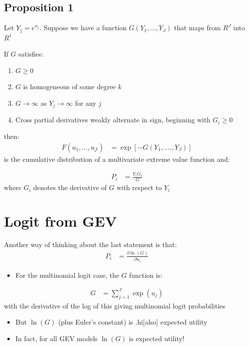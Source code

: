 \documentclass[11pt]{article}
\begin{document}
\subsection{Proposition 1 \cite{mcfadden1978}}
\label{sec:org4183645}
Let \(Y_{j}=e^{u_{j}}\). Suppose we have a function \(G(Y_{1},...,Y_{{J}})\) that maps from \(R^{{J}}\) into \(R^1\)

If \(G\) satisfies:
\begin{enumerate}
\item \(G\geq 0\)
\item \(G\) is homogeneous of some degree \(k\)
\item \(G\rightarrow \infty\) as \(Y_{j}\rightarrow \infty\) for any \(j\)
\item Cross partial derivatives weakly alternate in sign, beginning with \(G_{i}\geq 0\)
\end{enumerate}


then:
\begin{align*}
F(u_1,...,u_\mathcal{J})&=\exp\left[-G(Y_1,....,Y_{J})\right]
\end{align*}
is the cumulative distribution of a multivariate extreme value function and:

\begin{align*}
P_{i}&=\frac{Y_{i}G_{i}}{G}
\end{align*}
where \(G_i\) denotes the derivative of \(G\) with respect to \(Y_i\)

\section{Logit from GEV}
\label{sec:org33f13e0}

Another way of thinking about the last statement is that:
\begin{align*}
P_i&=\frac{\partial \ln(G)}{\partial u_i}
\end{align*}

\begin{itemize}
\item For the multinomial logit case, the \(G\) function is:
\end{itemize}
\begin{align*}
G&=\sum_{j=1}^{{J}}\exp(u_j)
\end{align*}
with the derivative of the log of this giving multinomial logit probabilities

\begin{itemize}
\item But \(\ln(G)\) (plus Euler's constant) is .hi[also] expected utility

\item In fact, for all GEV models \(\ln(G)\) is expected utility!
\end{itemize}
\end{document}
